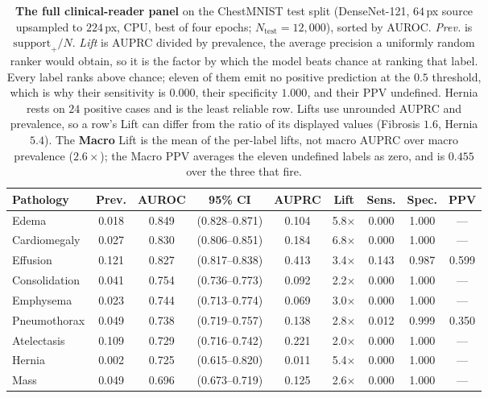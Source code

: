 \documentclass[10pt,twocolumn]{article}
\begin{document}
\begin{table}[tp]
\centering
\caption{\textbf{The full clinical-reader panel} on the ChestMNIST test split
(DenseNet-121, $64$\,px source upsampled to $224$\,px, CPU, best of four epochs;
$N_{\text{test}}{=}12{,}000$), sorted by AUROC. \emph{Prev.} is
$\text{support}_{+}/N$. \emph{Lift} is AUPRC divided by prevalence, the average
precision a uniformly random ranker would obtain, so it is the factor by which the
model beats chance at ranking that label. Every label ranks above chance; eleven of
them emit no positive prediction at the $0.5$ threshold, which is why their
sensitivity is $0.000$, their specificity $1.000$, and their PPV undefined. Hernia
rests on $24$ positive cases and is the least reliable row. Lifts use unrounded
AUPRC and prevalence, so a row's Lift can differ from the ratio of its displayed
values (Fibrosis $1.6$, Hernia $5.4$). The \textbf{Macro} Lift is the mean of the
per-label lifts, not macro AUPRC over macro prevalence ($2.6\times$); the Macro PPV
averages the eleven undefined labels as zero, and is $0.455$ over the three that
fire.}
\label{tab:panel}
\footnotesize
\begin{tabular}{@{}lcccccccc@{}}
\toprule
\textbf{Pathology} & \textbf{Prev.} & \textbf{AUROC} & \textbf{95\% CI} & \textbf{AUPRC} & \textbf{Lift} & \textbf{Sens.} & \textbf{Spec.} & \textbf{PPV} \\
\midrule
Edema              & 0.018 & 0.849 & (0.828--0.871) & 0.104 & 5.8$\times$ & 0.000 & 1.000 & --- \\
Cardiomegaly       & 0.027 & 0.830 & (0.806--0.851) & 0.184 & 6.8$\times$ & 0.000 & 1.000 & --- \\
Effusion           & 0.121 & 0.827 & (0.817--0.838) & 0.413 & 3.4$\times$ & 0.143 & 0.987 & 0.599 \\
Consolidation      & 0.041 & 0.754 & (0.736--0.773) & 0.092 & 2.2$\times$ & 0.000 & 1.000 & --- \\
Emphysema          & 0.023 & 0.744 & (0.713--0.774) & 0.069 & 3.0$\times$ & 0.000 & 1.000 & --- \\
Pneumothorax       & 0.049 & 0.738 & (0.719--0.757) & 0.138 & 2.8$\times$ & 0.012 & 0.999 & 0.350 \\
Atelectasis        & 0.109 & 0.729 & (0.716--0.742) & 0.221 & 2.0$\times$ & 0.000 & 1.000 & --- \\
Hernia             & 0.002 & 0.725 & (0.615--0.820) & 0.011 & 5.4$\times$ & 0.000 & 1.000 & --- \\
Mass               & 0.049 & 0.696 & (0.673--0.719) & 0.125 & 2.6$\times$ & 0.000 & 1.000 & --- \\

\end{tabular}
\end{table}
\end{document}
